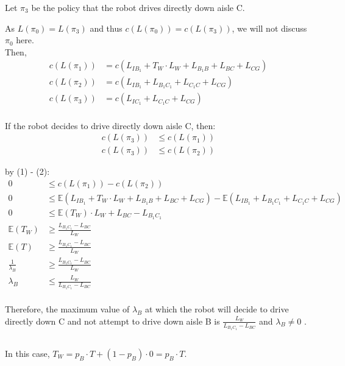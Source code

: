\documentclass{article}
\begin{document}
Let $\pi_{3}$ be the policy that the robot drives directly down aisle C.

As $L(\pi_{0}) = L(\pi_{3})$ and thus $c(L(\pi_{0}) )= c(L(\pi_{3}))$, we will not discuss $\pi_{0}$ here. \\

Then,
\begin{align*}
c(L(\pi_{1})) &= c(L_{IB_{1}} + T_{W} \cdot L_{W} + L_{B_{1}B} + L_{BC} + L_{CG})\\
c(L(\pi_{2})) &= c(L_{IB_{1}} +  L_{B_{1}C_{1}} + L_{C_{1}C} + L_{CG}) \\
c(L(\pi_{3})) &= c(L_{IC_{1}} +  L_{C_{1}C} + L_{CG}) \\
\end{align*}

If the robot decides to drive directly down aisle C, then:
\begin{align}
c(L(\pi_{3})) &\leq c(L(\pi_{1})) \\
c(L(\pi_{3})) &\leq c(L(\pi_{2}))
\end{align}

by (1) - (2):
\begin{align*}
0 &\leq c(L(\pi_{1})) - c(L(\pi_{2})) \\
0 &\leq \mathbb{E}(L_{IB_{1}} + T_{W} \cdot L_{W} + L_{B_{1}B} + L_{BC} + L_{CG}) - \mathbb{E}(L_{IB_{1}} +  L_{B_{1}C_{1}} + L_{C_{1}C} + L_{CG}) \\
0 &\leq \mathbb{E} (T_{W}) \cdot L_{W} + L_{BC} - L_{B_{1}C_{1}} \\
\mathbb{E} (T_{W}) & \geq \frac{L_{B_{1}C_{1}} - L_{BC}} {L_{W}} \\
\mathbb{E} (T) & \geq \frac{L_{B_{1}C_{1}} - L_{BC}} {L_{W}} \\
\frac{1}{\lambda_{B}} & \geq \frac{L_{B_{1}C_{1}} - L_{BC}} {L_{W}} \\
\lambda_{B} & \leq \frac{L_{W}} {L_{B_{1}C_{1}} - L_{BC}} \\
\end{align*}

Therefore, the maximum value of $\lambda_{B}$ at which the robot will decide to drive directly down C and not attempt to drive down aisle B is $\frac{L_{W}} {L_{B_{1}C_{1}} - L_{BC}}$ and $\lambda_{B} \ne 0$ .

\subsection{}
In this case, $T_{W} = p_{B} \cdot T + (1 - p_{B}) \cdot 0 = p_{B} \cdot T$.
\end{document}
